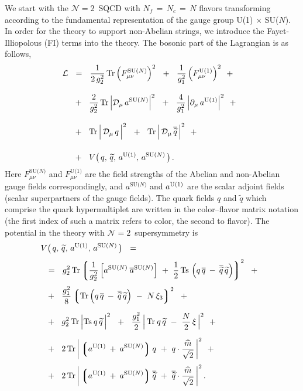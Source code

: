\documentclass[12pt]{article}
\newcommand{\ntwo}{${\mathcal N}=2$}
\newcommand{\p}{\partial}
\newcommand{\wt}{\widetilde}
\newcommand{\ov}{\overline}
\newcommand{\md}{\mathcal{D}}
\newcommand{\ml}{\mathcal{L}}
\newcommand{\lgr}{\left\lgroup}
\newcommand{\rgr}{\right\rgroup}
\newcommand{\aU}{a^{\rm U(1)}}
\newcommand{\aN}{a^\text{SU($N$)}}
\newcommand{\baN}{\ov{a}{}^\text{SU($N$)}}
\newcommand{\qt}{\wt{q}}
\newcommand{\bq}{\ov{q}}
\newcommand{\bqt}{\overline{\widetilde{q}}}
\newcommand{\Tr}{\text{Tr}}
\newcommand{\Ts}{\text{Ts}}
\newcommand{\mhat}{\widehat{m}}
\begin{document}
	We start with the \ntwo\, SQCD with $ N_f \,=\, N_c \,=\, N $ flavors transforming according to the  fundamental
	representation of the gauge group U(1)$\,\times\,$SU($N$).
	In order for the theory to support  non-Abelian strings, we introduce the Fayet-Illiopolous (FI) terms into the
	theory.
	The bosonic part of the Lagrangian is as follows,
\begin{align}
%
\notag
	\ml    & ~~=~~
	\frac{1}{2\, g_2^2}\, \Tr\, \Big( F_{\mu\nu}^\text{SU($N$)} \Big)^2  ~~+~~
	\frac{1}{g_1^2}\, \Big( F_{\mu\nu}^\text{U(1)} \Big)^2  ~~+~~
	\\[3mm]
%
\notag
	&
	~~+~~
	\frac{2}{g_2^2}\, \Tr\, \Big| \md_\mu\, \aN \Big|^2  ~~+~~
	\frac{4}{g_1^2}\, \Big| \p_\mu\, \aU \Big|^2  ~~+~~
	\\[3mm]
%
\label{bulk}
	&
	~~+~~
	\Tr\, \Big|\, \md_\mu\, q \,\Big|^2  ~~+~~
	\Tr\, \Big|\, \md_\mu\, \bqt \,\Big|^2
	~~+~~
	\\[4mm]
%
\notag
	&
	~~+~~
	V \big(\, q,\, \qt,\, \aU,\, \aN \,\big) \,.
\end{align}
	Here $ F_{\mu\nu}^\text{SU($N$)} $ and $ F_{\mu\nu}^\text{U(1)} $ are the field strengths
	of the Abelian and non-Abelian gauge fields correspondingly, 
	and $ \aN $ and $ \aU $ are the scalar adjoint fields (scalar superpartners of the gauge fields).
	The quark fields $ q $ and $ \qt $ which comprise the quark hypermultiplet are written in the
	color--flavor matrix notation (the first index of such a matrix refers to  color, the second
	to  flavor).
	The potential in the theory with \ntwo\, supersymmetry is
\begin{align}
%
\notag
	&
	V \big(\, q,\, \qt,\, \aU,\, \aN \,\big) ~~=~~ 
	\\[1mm]
%
\notag
	&
	~~=~~
	g_2^2\, \Tr \lgr \frac{1}{g_2^2}\, \Big[ \aN\: \baN \Big]  ~+~  \frac{1}{2}\, \Ts\, \left( q\,\bq \:-\: \bqt\,\qt \right) \rgr^2 
	~~+~~
	\\[1mm]
%
\notag
	&
	~~+~~
	\frac{g_1^2}{8} \lgr  \Tr \left( q\,\bq \:-\: \bqt\,\qt \right) ~-~ N\,\xi_3  \rgr^2
	~~+~~
	\\[2mm]
%
\label{pot}
	&
	~~+~~
	g_2^2\, \Tr\, \Big| \Ts\: q\,\qt \,\Big|^2
	~~+~~
	\frac{g_1^2}{2}\, \Big|\, \Tr\: q\,\qt  ~-~  \frac{N}{2}\,\xi \,\Big|^2
	~~+~~
	\\[2mm]
%
\notag
	&
	~~+~~
	2\, \Tr\, \bigg| \lgr \aU \:+\: \aN \rgr q  ~+~  q \cdot \frac{\mhat}{\sqrt{2}} \,\bigg|^2
	~~+~~
	\\[1mm]
%
\notag
	&
	~~+~~
	2\, \Tr\, \bigg| \lgr \aU \:+\: \aN \rgr \bqt  ~+~  \bqt \cdot \frac{\mhat}{\sqrt{2}} \,\bigg|^2
	\,.
\end{align}
\end{document}
